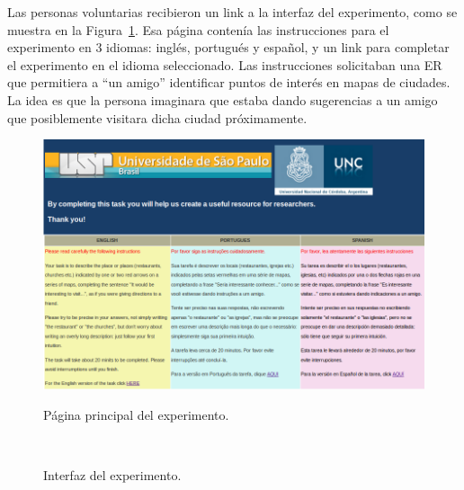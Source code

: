 Las personas voluntarias recibieron un link a la interfaz del experimento, como se muestra en la Figura~\ref{fig_pagPrincipal_seleccion_idioma}. Esa p\'agina conten\'{i}a las instrucciones para el experimento en 3 idiomas: ingl\'es, portugu\'es y espa\~{n}ol, y un link para completar el experimento en el idioma seleccionado. Las instrucciones solicitaban una ER que permitiera a ``un amigo'' identificar puntos de inter\'es en mapas de ciudades. La idea es que la persona imaginara que estaba dando sugerencias a un amigo que posiblemente visitara dicha ciudad pr\'oximamente. 
\begin{figure}[ht]
\begin{center}
\includegraphics[width=17cm]{images/pagPrincipal.png}\\[0pt]
\caption{P\'agina principal del experimento.}
\label{fig_pagPrincipal_seleccion_idioma}
\end{center}
\end{figure}


\begin{figure}[h]
\begin{center}
\\[0pt]
\caption{Interfaz del experimento.}
\label{fig_interface}
\end{center}
\end{figure}

